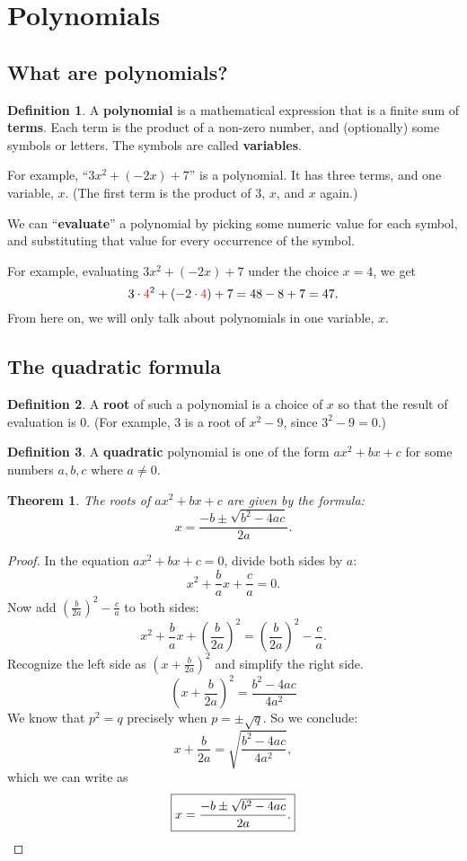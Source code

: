 \documentclass[12pt,a4paper]{article}
\theoremstyle{plain}\newtheorem*{mythm}{Theorem}
\theoremstyle{definition}\newtheorem*{mydef}{Definition}
\newcommand{\red}[1]{{\color{red}#1}}
\begin{document}
\section{Polynomials}
\subsection{What are polynomials?}
\begin{mydef}
	A \textbf{polynomial} is a mathematical expression that is a finite sum of \textbf{terms}. Each term is the product of a non-zero number, and (optionally) some symbols or letters. The symbols are called \textbf{variables}.
\end{mydef}

For example, ``$3x^2 + (-2x) + 7$'' is a polynomial. It has three terms, and one variable, $x$. (The first term is the product of $3$, $x$, and $x$ again.)

We can ``\textbf{evaluate}'' a polynomial by picking some numeric value for each symbol, and substituting that value for every occurrence of the symbol.

For example, evaluating $3x^2 + (-2x) + 7$ under the choice $x=4$, we get \[
	3 \cdot \red{4}^2 + (-2 \cdot \red{4}) + 7 = 48 - 8 + 7 = 47.
\]
From here on, we will only talk about polynomials in one variable, $x$.

\subsection{The quadratic formula}
\begin{mydef}
	A \textbf{root} of such a polynomial is a choice of $x$ so that the result of evaluation is $0$. (For example, 3 is a root of $x^2 - 9$, since $3^2 - 9 = 0$.)
\end{mydef} 

\begin{mydef}
	A \textbf{quadratic} polynomial is one of the form $ax^2 + bx + c$ for some numbers $a, b, c$ where $a \neq 0$.
\end{mydef}

\begin{mythm}
	The roots of $a x^2 + b x + c$ are given by the formula: \[
		\boxed{x = \frac{-b \pm \sqrt{b^2-4ac}}{2a}.}
	\]
\end{mythm}

\begin{proof}
	In the equation $a x^2 + b x + c = 0$, divide both sides by $a$: \[
		x^2 + \frac{b}{a} x + \frac{c}{a} = 0.
	\]
	Now add $\left( \frac{b}{2a} \right)^2 - \frac{c}{a}$ to both sides: \[
		x^2 + \frac{b}{a} x + \left( \frac{b}{2a} \right)^2 = \left( \frac{b}{2a} \right)^2 - \frac{c}{a}.
	\]
	Recognize the left side as $(x + \frac{b}{2a})^2$ and simplify the right side. \[
		\left(x + \frac{b}{2a}\right)^2 = \frac{b^2 - 4ac}{4a^2}
	\]
	We know that $p^2 = q$ precisely when $p = \pm \sqrt{q}$. So we conclude: \[
		x + \frac{b}{2a} = \sqrt{\frac{b^2 - 4ac}{4a^2}},
	\]
	which we can write as \[
		\boxed{x = \frac{-b \pm \sqrt{b^2 - 4ac}}{2a}.} \qedhere
	\]
\end{proof}
\end{document}
